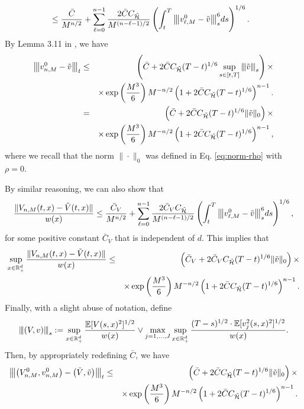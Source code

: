 \documentclass[11pt]{article}
\theoremstyle{definition}
\theoremstyle{plain}
\newcommand{\R}{\mathbb{R}}
\newcommand{\cH}{{\cal H}}
\newcommand{\vertiii}[1]{{\left\vert\kern-0.25ex\left\vert\kern-0.25ex\left\vert #1 
    \right\vert\kern-0.25ex\right\vert\kern-0.25ex\right\vert}}
\begin{document}
\begin{appendices}
\begin{align*}
  & \leq \frac{\bar C}{M^{n/2}} + \sum_{\ell=0}^{n-1}  \frac{2 \bar C C_{\tilde \cH}}{M^{(n - \ell - 1)/2}} 
  \left( \int_t^T \vertiii{v_{\ell,M}^{0} - \tilde{v}}_s^6 ds \right)^{1/6}.
  \end{align*}
  By Lemma 3.11 in \cite{HJKN2020}, we have 
  \begin{eqnarray*}
  \vertiii{v_{n,M}^{0} - \tilde{v}}_{t} &\leq & \left(\bar C + 2 \bar C C_{\tilde \cH} (T-t)^{1/6} \sup_{s\in [t, T]} \vertiii{\tilde v}_s\right) \times \\
  & & \times \exp\left(\frac{M^3}{6}\right) M^{-n/2} \left(1+2 \bar C C_{\tilde \cH} (T-t)^{1/6}\right)^{n-1}. \\
  &= & \left(\bar C + 2 \bar C C_{\tilde \cH} (T-t)^{1/6} \|\tilde v\|_0\right) \times \\
  & & \times \exp\left(\frac{M^3}{6}\right) M^{-n/2} \left(1+2 \bar C C_{\tilde \cH} (T-t)^{1/6}\right)^{n-1},
  \end{eqnarray*}
  where we recall that the norm $\|\cdot\|_0$ was defined in Eq. \eqref{eq:norm-rho} with $\rho = 0$.
  
  By similar reasoning, we can also show that 
  \begin{equation*}
  \frac{\| V_{n,M}(t,x) - \tilde V(t,x) \|}{w(x)} \leq \frac{\bar C_V}{M^{n/2}} + 
  \sum_{\ell=0}^{n-1}  \frac{2 \bar C_V C_{\tilde \cH}}{M^{(n - \ell - 1)/2}} 
  \left( \int_t^T \vertiii{v_{\ell,M}^{0} - \tilde{v}}_s^6 ds \right)^{1/6},
  \end{equation*}
  for some positive constant $\bar C_V$ that is independent of $d$. This implies that 
  \begin{eqnarray*}
  \sup_{x\in \R_+^d} \frac{\| V_{n,M}(t,x) - \tilde V(t,x) \|}{w(x)} & \leq & \left(\bar C_V + 2 \bar C_V C_{\tilde \cH} (T-t)^{1/6} \|\tilde v\|_0\right) \times \\
  & & \times \exp\left(\frac{M^3}{6}\right) M^{-n/2} \left(1+2 \bar C C_{\tilde \cH} (T-t)^{1/6}\right)^{n-1}.
  \end{eqnarray*}
  Finally, with a slight abuse of notation, define 
  \begin{equation}
  \vertiii{(V,v)}_{s} := \sup_{x \in \mathbb{R}_+^d} 
  \frac{\mathbb{E}[ V(s,x)^2 ]^{1/2}}{w(x)} \vee \max_{j=1,\dots,J} \sup_{x \in \mathbb{R}_+^d} 
  \frac{(T - s)^{1/2} \cdot \mathbb{E}[ v_j^2(s,x)^2 ]^{1/2}}{w(x)}. 
  \end{equation}
  Then, by appropriately redefining $\bar C$, we have
  \begin{eqnarray*}
  \vertiii{\left(V_{n,M}^{0}, v_{n,M}^{0}\right) - \left(\tilde V, \tilde{v}\right)}_{t} 
  &\leq & \left(\bar C + 2 \bar C C_{\tilde \cH} (T-t)^{1/6} \|\tilde v\|_0\right) \times \\
  & & \times \exp\left(\frac{M^3}{6}\right) M^{-n/2} \left(1+2 \bar C C_{\tilde \cH} (T-t)^{1/6}\right)^{n-1}.
  \end{eqnarray*}
  

\end{appendices}
\end{document}
